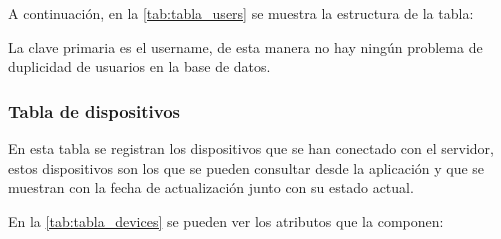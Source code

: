 A continuación, en la \autoref{tab:tabla_users} se muestra la estructura de la tabla:
\begin{table}[H]
	\centering
	\caption{Tabla users BBDD}
	\label{tab:tabla_users}
\end{table}
La clave primaria es el username, de esta manera no hay ningún problema de duplicidad de usuarios en la base de datos.

\subsubsection{Tabla de dispositivos}
En esta tabla se registran los dispositivos que se han conectado con el servidor, estos dispositivos son los que se pueden consultar desde la aplicación y que se muestran con la fecha de actualización junto con su estado actual.

En la \autoref{tab:tabla_devices} se pueden ver los atributos que la componen:

